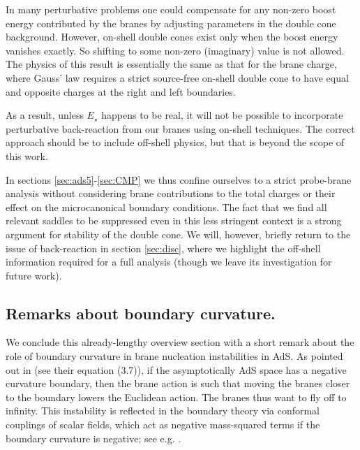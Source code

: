 \documentclass[11pt]{article}
\begin{document}
In many perturbative problems one could compensate for any non-zero boost energy contributed by the branes by adjusting parameters in the double cone background.  
However, on-shell double cones exist only when the boost energy vanishes exactly.  
So shifting to some non-zero (imaginary) value is not allowed.  
The physics of this result is essentially the same as that for the brane charge, where Gauss' law requires a strict source-free on-shell double cone to have equal and opposite charges at the right and left boundaries.

As a result, unless $E_\star$ happens to be real, it will not be possible to incorporate perturbative back-reaction from our branes using on-shell techniques.  
The correct approach should be to include off-shell physics, but that is beyond the scope of this work.

In sections \ref{sec:ads5}-\ref{sec:CMP} we thus confine ourselves to a strict probe-brane analysis without considering brane contributions to the total charges or their effect on the microcanonical boundary conditions.
The fact that we find all relevant saddles to be suppressed even in this less stringent context is a strong argument for stability of the double cone. 
We will, however, briefly return to the issue of back-reaction in section \ref{sec:disc}, where we highlight the off-shell information required for a full analysis (though we leave its investigation for future work).

\subsection{Remarks about boundary curvature.}
We conclude this already-lengthy overview section with a short remark about the role of boundary curvature in brane nucleation instabilities in AdS.
As pointed out in \cite{MaldacenaMaoz} (see their equation (3.7)), if the asymptotically AdS space has a negative curvature boundary, then the brane action is such that moving the branes closer to the boundary lowers the Euclidean action.
The branes thus want to fly off to infinity.
This instability is reflected in the boundary theory via conformal couplings of scalar fields, which act as negative mass-squared terms if the boundary curvature is negative; see e.g. \cite{Maldacena:1998uz,Seiberg:1999xz,Maldacena:2000hw}.
\end{document}
